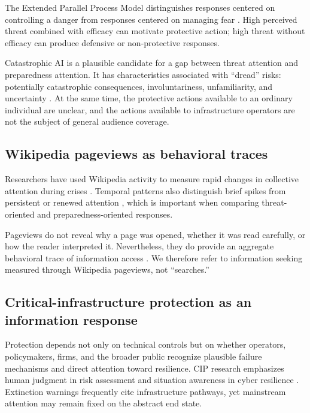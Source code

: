 \elsevierclasstrue\documentclass[preprint,12pt]{elsarticle}%
\begin{document}
The Extended Parallel Process Model distinguishes responses centered on controlling a danger from responses centered on managing fear \citep{witte1992eppm}. High perceived threat combined with efficacy can motivate protective action; high threat without efficacy can produce defensive or non-protective responses.

Catastrophic AI is a plausible candidate for a gap between threat attention and preparedness attention. It has characteristics associated with ``dread'' risks: potentially catastrophic consequences, involuntariness, unfamiliarity, and uncertainty \citep{slovic1987risk}. At the same time, the protective actions available to an ordinary individual are unclear, and the actions available to infrastructure operators are not the subject of general audience coverage.


\subsection{Wikipedia pageviews as behavioral traces}

Researchers have used Wikipedia activity to measure rapid changes in collective attention during crises \citep{palen2016crisis,ribeiro2021wikipedia}. Temporal patterns also distinguish brief spikes from persistent or renewed attention \citep{rushing2026thee}, which is important when comparing threat-oriented and preparedness-oriented responses.

Pageviews do not reveal why a page was opened, whether it was read carefully, or how the reader interpreted it. Nevertheless, they do provide an aggregate behavioral trace of information access \citep{dimitrov2018query}. We therefore refer to information seeking measured through Wikipedia pageviews, not ``searches.''


\subsection{Critical-infrastructure protection as an information response}

Protection depends not only on technical controls but on whether operators, policymakers, firms, and the broader public recognize plausible failure mechanisms and direct attention toward resilience. CIP research emphasizes human judgment in risk assessment \citep{papamichael2024risk} and situation awareness in cyber resilience \citep{bellini2025situation}. Extinction warnings frequently cite infrastructure pathways, yet mainstream attention may remain fixed on the abstract end state.
\end{document}
